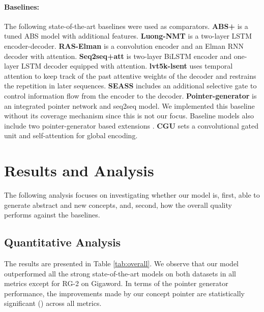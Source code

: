 \documentclass[11pt,a4paper]{article}
\begin{document}
\paragraph{Baselines:}
The following state-of-the-art baselines were used as comparators. 
\textbf{ABS+} \cite{DBLP:conf/emnlp/RushCW15} is a tuned ABS model with additional features.
\textbf{Luong-NMT} \cite{DBLP:conf/emnlp/LuongPM15} is a  two-layer LSTM encoder-decoder.
\textbf{RAS-Elman} \cite{Chopra2016Abstractive} is a convolution encoder and an Elman RNN decoder with attention. 
\textbf{Seq2seq+att} is two-layer BiLSTM encoder and one-layer LSTM decoder equipped with attention. 
\textbf{lvt5k-lsent} \cite{DBLP:conf/conll/NallapatiZSGX16} uses   temporal attention to keep track of the past attentive weights of the decoder and restrains the repetition in later sequences. 
\textbf{SEASS} \cite{DBLP:conf/acl/ZhouYWZ17} includes an additional selective gate to control information flow from the encoder to the decoder.
\textbf{Pointer-generator} \cite{DBLP:conf/acl/SeeLM17}  is an integrated   pointer network and  seq2seq model. 
We implemented this baseline without its coverage mechanism since this is not our focus. 
Baseline models also include two pointer-generator based extensions \cite{DBLP:conf/acl/BansalPG18,DBLP:conf/coling/LiZZZ18}. \textbf{CGU} \cite{DBLP:conf/acl/LinSMS18} sets a convolutional gated unit and self-attention for global encoding.







     

\section{Results and Analysis}
The following analysis focuses on investigating whether our model is, first, able to generate abstract and new concepts, and, second, how the overall quality performs against the baselines.
\subsection{Quantitative Analysis}

The results are presented in Table \ref{tab:overall}. We observe that our model outperformed all the strong state-of-the-art models on both datasets in all metrics except for RG-2 on Gigaword. In terms of the  pointer generator performance, the improvements made by our concept pointer are statistically significant 
() across all metrics.
\end{document}
